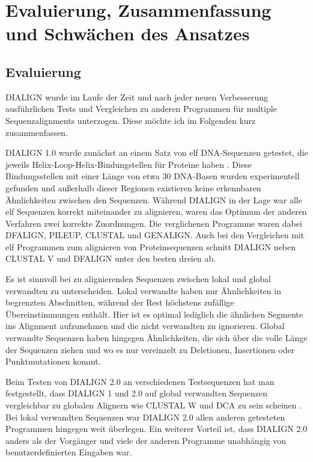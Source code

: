 \section{Evaluierung, Zusammenfassung und Schwächen des Ansatzes}

\subsection{Evaluierung}

DIALIGN	wurde im Laufe der Zeit und nach jeder neuen Verbesserung ausführlichen Tests und Vergleichen zu anderen Programmen für multiple Sequenzalignments unterzogen. Diese möchte ich im Folgenden kurz zusammenfassen.

DIALIGN 1.0 wurde zunächst an einem Satz von elf DNA-Sequenzen getestet, die jeweils Helix-Loop-Helix-Bindungstellen für Proteine haben \cite{mdw96}. Diese Bindungsstellen mit einer Länge von etwa 30 DNA-Basen wurden experimentell gefunden und außerhalb dieser Regionen existieren keine erkennbaren Ähnlichkeiten zwischen den Sequenzen. Während DIALIGN in der Lage war alle elf Sequenzen korrekt miteinander zu alignieren, waren das Optimum der anderen Verfahren zwei korrekte Zuordnungen. Die verglichenen Programme waren dabei DFALIGN, PILEUP, CLUSTAL und GENALIGN. Auch bei den Vergleichen mit elf Programmen zum alignieren von Proteinsequenzen schnitt DIALIGN neben CLUSTAL V und DFALIGN unter den besten dreien ab.

Es ist sinnvoll bei zu alignierenden Sequenzen zwischen lokal und global verwandten zu unterscheiden. Lokal verwandte haben nur Ähnlichkeiten in begrenzten Abschnitten, während der Rest höchstens zufällige Übereinstimmungen enthält. Hier ist es optimal lediglich die ähnlichen Segmente ins Alignment aufzunehmen und die nicht verwandten zu ignorieren. Global verwandte Sequenzen haben hingegen Ähnlichkeiten, die sich über die volle Länge der Sequenzen ziehen und wo es nur vereinzelt zu Deletionen, Insertionen oder Punktmutationen kommt.

Beim Testen von DIALIGN 2.0 an verschiedenen Testsequenzen hat man festgestellt, dass DIALIGN 1 und 2.0 auf global verwandten Sequenzen vergleichbar zu globalen Alignern wie CLUSTAL W und DCA zu sein scheinen \cite{mahd98}. Bei lokal verwandten Sequenzen war DIALIGN 2.0 allen anderen getesteten Programmen hingegen weit überlegen. Ein weiterer Vorteil ist, dass DIALIGN 2.0 anders als der Vorgänger und viele der anderen Programme unabhängig von benutzerdefinierten Eingaben war.

